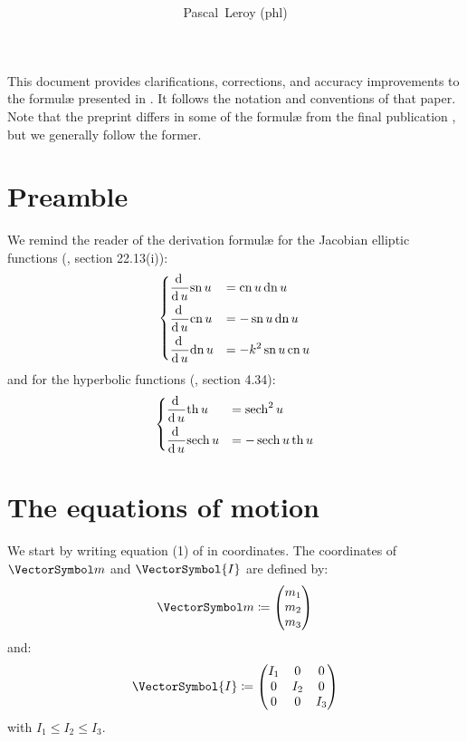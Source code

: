\documentclass[10pt, a4paper, twoside]{basestyle}
\title{%
\textdisplay{%
On an Article by Celledoni et al.%
}%
}
\author{Pascal~Leroy (phl)}
\begin{document}
\maketitle
\begin{sloppypar}
\noindent
This document provides clarifications, corrections, and accuracy improvements to the formul{\ae} presented in \cite{Celledoni2007}.  It follows the notation
and conventions of that paper.  Note that the preprint \cite{Celledoni2007} differs in some of the formul{\ae} from the final publication \cite{Celledoni2008},
but we generally follow the former.
\end{sloppypar}

\section*{Preamble}
We remind the reader of the derivation formul{\ae} for the Jacobian elliptic functions (\cite{NistHMF2010}, section 22.13(i)):
\[
\begin{dcases}
\frac{\operatorname{d}^{} {}}{{\operatorname{d} {u}}^{}}{\operatorname{sn} u} &= \operatorname{cn} u \operatorname{dn} u \\
\frac{\operatorname{d}^{} {}}{{\operatorname{d} {u}}^{}}{\operatorname{cn} u} &= -\operatorname{sn} u \operatorname{dn} u \\
\frac{\operatorname{d}^{} {}}{{\operatorname{d} {u}}^{}}{\operatorname{dn} u} &= -k^2 \operatorname{sn} u \operatorname{cn} u
\end{dcases}
\]
and for the hyperbolic functions (\cite{NistHMF2010}, section 4.34):
\[
\begin{dcases}
\frac{\operatorname{d}^{} {}}{{\operatorname{d} {u}}^{}}{\operatorname{th} u} &= \operatorname{sech}^2 u \\
\frac{\operatorname{d}^{} {}}{{\operatorname{d} {u}}^{}}{\operatorname{sech} u} &= -\operatorname{sech} u \operatorname{th} u
\end{dcases}
\]

\section*{The equations of motion}
We start by writing equation (1) of \cite{Celledoni2007} in coordinates.  The coordinates of $\vm$ and $\VectorSymbol{I}$ are defined by:
\[
\vm\DefineAs
\begin{pmatrix}
m_1 \\ m_2 \\ m_3
\end{pmatrix}
\]
and:
\[
\VectorSymbol{I}\DefineAs
\begin{pmatrix}
I_1 & 0 & 0 \\ 0 & I_2 & 0 \\ 0 & 0 & I_3
\end{pmatrix}
\]
with $I_1 \leq I_2 \leq I_3$.
\end{document}
